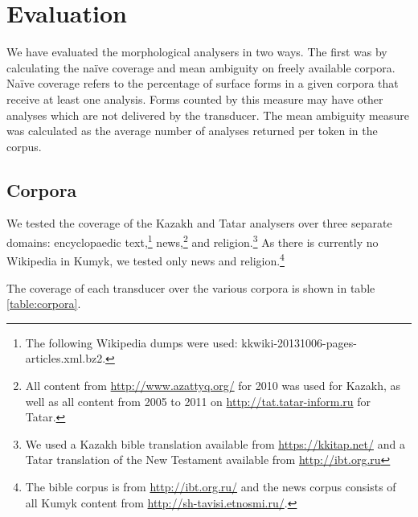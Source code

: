 \documentclass[a4paper,11pt,twocolumn]{article}
\begin{document}
\section{Evaluation}\label{sec:evaluation}

We have evaluated the morphological analysers in two ways. The first was by calculating the naïve coverage and mean ambiguity on freely available corpora. Naïve coverage refers to the percentage of surface forms in a given corpora that receive at least one analysis.  Forms counted by this measure may have other analyses which are not delivered by the transducer. The mean ambiguity measure was calculated as the average number of analyses returned per token in the corpus.


\subsection{Corpora}

We tested the coverage of the Kazakh and Tatar analysers over three separate domains: encyclopaedic text,\footnote{The following Wikipedia dumps were used: kkwiki-20131006-pages-articles.xml.bz2.} %
 news,\footnote{All content from \url{http://www.azattyq.org/} for 2010 was used for Kazakh, as well as all content from 2005 to 2011 on \url{http://tat.tatar-inform.ru} for Tatar.} and religion.\footnote{We used a Kazakh bible translation available from \url{https://kkitap.net/} and a Tatar translation of the New Testament available from \url{http://ibt.org.ru}}  As there is currently no Wikipedia in Kumyk, we tested only news and religion.\footnote{The bible corpus is from \url{http://ibt.org.ru/} and the news corpus consists of all Kumyk content from \url{http://sh-tavisi.etnosmi.ru/}.}




The coverage of each transducer over the various corpora is shown in table \ref{table:corpora}.
\end{document}
